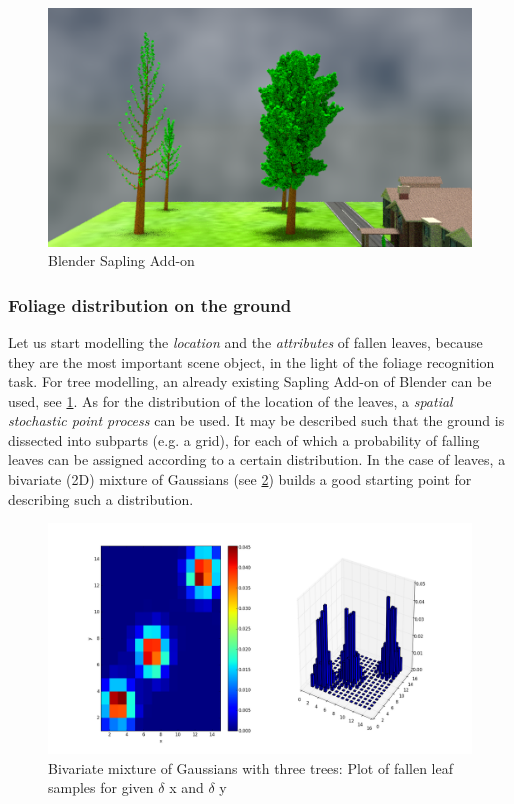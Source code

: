 \documentclass[fleqn,10pt]{SelfArx} %
\begin{document}
\begin{figure}[ht]\centering
\includegraphics[width=\linewidth]{Figures/ex1.png}
\caption{Blender Sapling Add-on}
\label{fig:sapling}
\end{figure}

\subsubsection{Foliage distribution on the ground}

Let us start modelling the \emph{location} and the \emph{attributes} of fallen leaves, because they are the most important scene object, in the light of the foliage recognition task. For tree modelling, an already existing Sapling Add-on of Blender can be used, see \ref{fig:sapling}.  As for the distribution of the location of the leaves, a \emph{spatial stochastic point process} can be used. It may be described such that the ground is dissected into subparts (e.g. a grid), for each of which a probability of falling leaves can be assigned according to a certain distribution. In the case of leaves, a bivariate (2D) mixture of Gaussians (see \ref{fig:gausMix}) builds a good starting point for describing such a distribution. 

\begin{figure}[ht]\centering
\includegraphics[width=\linewidth]{Figures/gausMix.png}
\caption{Bivariate mixture of Gaussians with three trees: Plot of fallen leaf samples for given $\delta$ x and $\delta$ y}
\label{fig:gausMix}
\end{figure}
\end{document}
